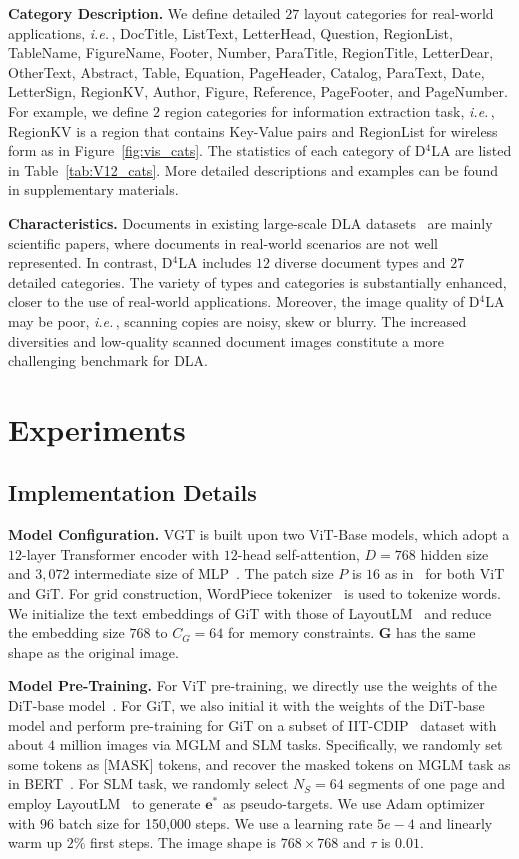 \documentclass[10pt,twocolumn,letterpaper]{article}
\def\ie{\emph{i.e.}\,}
\begin{document}
\noindent
\textbf{Category Description.}
We define detailed $27$ layout categories for real-world applications, 
\ie, DocTitle, ListText, LetterHead, Question, RegionList, TableName, FigureName, Footer, Number,
ParaTitle, RegionTitle, LetterDear, OtherText, Abstract, Table, Equation, PageHeader, Catalog, ParaText, Date, LetterSign, RegionKV, Author, Figure, Reference, PageFooter, and PageNumber.
For example, we define $2$ region categories for information extraction task, \ie,
RegionKV is a region that contains Key-Value pairs and RegionList for wireless form as in Figure~\ref{fig:vis_cats}.
The statistics of each category of D$^4$LA are listed in Table~\ref{tab:V12_cats}.
More detailed descriptions and examples can be found in supplementary materials.

\noindent
\textbf{Characteristics.}
Documents in existing large-scale DLA datasets~\cite{zhong2019publaynet,li2020docbank} are mainly scientific papers, where documents in real-world scenarios are not well represented.
In contrast, D$^4$LA includes $12$ diverse document types and $27$ detailed categories.
The variety of types and categories is substantially enhanced, closer to the use of real-world applications.
Moreover, the image quality of D$^4$LA  may be poor, \ie, scanning copies are noisy, skew or blurry.
The increased diversities and low-quality scanned document images constitute a more challenging benchmark for DLA.




\section{Experiments}
\subsection{Implementation Details}
\noindent
\textbf{Model Configuration.}  
VGT is built upon two ViT-Base models, which adopt a $12$-layer Transformer encoder 
with $12$-head self-attention, $D=768$ hidden size and $3,072$ intermediate size of MLP~\cite{vit}.
The patch size $P$ is $16$ as in~\cite{vit} for both ViT and GiT.
For grid construction, WordPiece tokenizer~\cite{devlin2018bert} is used to tokenize words.
We initialize the text embeddings of GiT with those of LayoutLM~\cite{xu2020layoutlm}
and reduce the embedding size $768$ to $C_G=64$ for memory constraints.
$\mathbf{G}$ has the same shape as the original image.


\noindent
\textbf{Model Pre-Training.} 
For ViT pre-training, we directly use the weights of the DiT-base model~\cite{li2022dit}.
For GiT, we also initial it with the weights of the DiT-base model and perform pre-training for GiT on a subset of IIT-CDIP~\cite{iit} dataset with about $4$ million images via MGLM and SLM tasks.
Specifically, we randomly set some tokens as [MASK] tokens, and recover the masked tokens on MGLM task as in BERT~\cite{devlin2018bert}.
For SLM task, we randomly select $N_S=64$ segments of one page
and employ LayoutLM~\cite{xu2020layoutlm} to generate $\mathbf{e}^*$ as pseudo-targets.
We use Adam optimizer with $96$ batch size for 150,000 steps.
We use a learning rate $5e-4$ and linearly warm up $2\%$ first steps.
The image shape is $768 \times 768$ and $\tau$ is $0.01$.
\end{document}
